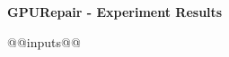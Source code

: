 \documentclass[runningheads,anonymous=true]{llncs}
\begin{document}
\begin{center}
  \Large\bfseries\boldmath
  GPURepair - Experiment Results
\end{center}

@@inputs@@



\end{document}
